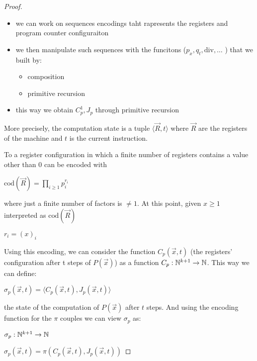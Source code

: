 \begin{theorem}[$\mathcal{R} = \mathcal{C}$]
\begin{proof}
    \begin{itemize}
    \item we can work on sequences encodings taht rapresents the registers and program counter configuraiton
    \item we then manipulate such sequences  with the funcitons (\( p_x, q_t, \text{div}, \dots \) ) that we built by:
      \begin{itemize}
      \item composition
      \item primitive recursion
      \end{itemize}
    \item this way we obtain $C_p^1, J_p$ through primitive recursion
    \end{itemize}
    More precisely, the computation state is a tuple
    $\langle \vec{R}, t \rangle$ where $\vec{R}$ are the registers of the
    machine and $t$ is the current instruction.

    To a register configuration in which a finite number of registers
    contains a value other than 0 can be encoded with

    \begin{center}
      $\text{cod}(\vec{R}) = \prod\limits_{i \geq 1}p_i^{r_i}$
    \end{center}

    where just a finite number of factors is $\neq 1$. At this point,
    given $x \geq 1$ interpreted as $\text{cod}(\vec{R})$

    \begin{center}
      $r_i = (x)_i$
    \end{center}

    Using this encoding, we can consider the function $C_p(\vec{x},t)$
    (the registers' configuration after t steps of $P(\vec{x})$) as a
    function $C_p : \mathbb{N}^{k+1} \rightarrow \mathbb{N}$. This way we can define:

    \begin{center}
      $\sigma_p(\vec{x},t) = \langle C_p(\vec{x},t), J_p(\vec{x},t) \rangle$
    \end{center}

    the state of the computation of $P(\vec{x})$ after $t$ steps. And
    using the encoding function for the $\pi$ couples we can view
    $\sigma_p$ as:

    $\sigma_p : \mathbb{N}^{k+1} \rightarrow \mathbb{N}$

    $\sigma_p(\vec{x}, t) = \pi(C_p(\vec{x},t), J_p(\vec{x},t))$


\end{proof}
\end{theorem}
